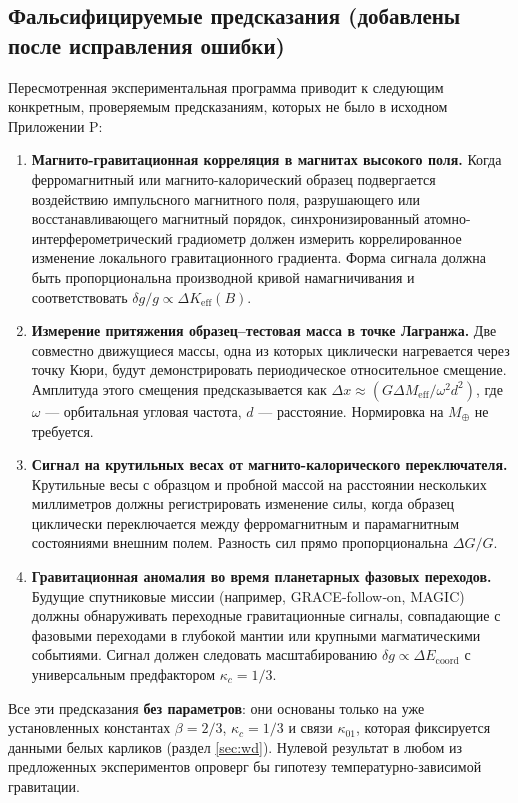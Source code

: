 \documentclass[12pt]{article}
\theoremstyle{remark}
\begin{document}
	\subsection{Фальсифицируемые предсказания (добавлены после исправления ошибки)}
	\label{subsec:new-predictions}
	
	Пересмотренная экспериментальная программа приводит к следующим конкретным, проверяемым предсказаниям, которых не было в исходном Приложении P:
	
	\begin{enumerate}
		\item \textbf{Магнито-гравитационная корреляция в магнитах высокого поля.}
		Когда ферромагнитный или магнито-калорический образец подвергается воздействию импульсного магнитного поля, разрушающего или восстанавливающего магнитный порядок, синхронизированный атомно-интерферометрический градиометр должен измерить коррелированное изменение локального гравитационного градиента. Форма сигнала должна быть пропорциональна производной кривой намагничивания и соответствовать $\delta g/g \propto \Delta K_{\mathrm{eff}}(B)$.
		\item \textbf{Измерение притяжения образец–тестовая масса в точке Лагранжа.}
		Две совместно движущиеся массы, одна из которых циклически нагревается через точку Кюри, будут демонстрировать периодическое относительное смещение. Амплитуда этого смещения предсказывается как $\Delta x \approx (G \Delta M_{\mathrm{eff}} / \omega^2 d^2)$, где $\omega$ — орбитальная угловая частота, $d$ — расстояние. Нормировка на $M_\oplus$ не требуется.
		\item \textbf{Сигнал на крутильных весах от магнито-калорического переключателя.}
		Крутильные весы с образцом и пробной массой на расстоянии нескольких миллиметров должны регистрировать изменение силы, когда образец циклически переключается между ферромагнитным и парамагнитным состояниями внешним полем. Разность сил прямо пропорциональна $\Delta G/G$.
		\item \textbf{Гравитационная аномалия во время планетарных фазовых переходов.}
		Будущие спутниковые миссии (например, GRACE‑follow‑on, MAGIC) должны обнаруживать переходные гравитационные сигналы, совпадающие с фазовыми переходами в глубокой мантии или крупными магматическими событиями. Сигнал должен следовать масштабированию $\delta g \propto \Delta E_{\mathrm{coord}}$ с универсальным предфактором $\kappa_c = 1/3$.
	\end{enumerate}
	
	Все эти предсказания \textbf{без параметров}: они основаны только на уже установленных константах $\beta = 2/3$, $\kappa_c = 1/3$ и связи $\kappa_{01}$, которая фиксируется данными белых карликов (раздел \ref{sec:wd}). Нулевой результат в любом из предложенных экспериментов опроверг бы гипотезу температурно-зависимой гравитации.
	
\end{document}
